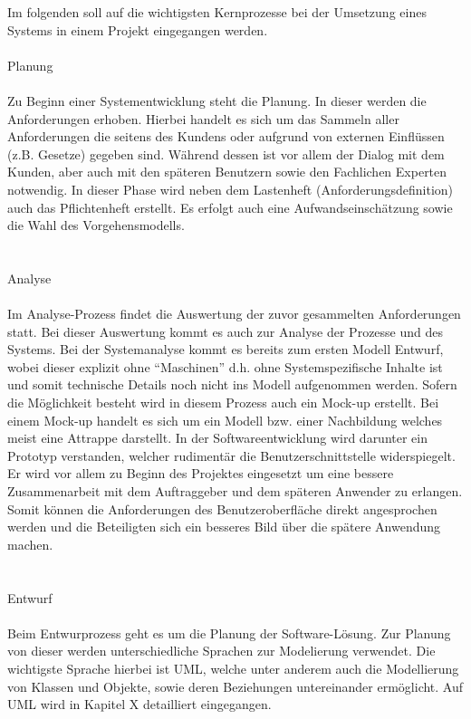 Im folgenden soll auf die wichtigsten Kernprozesse bei der Umsetzung eines Systems in einem Projekt eingegangen werden.\\
\\
Planung\\
\\
Zu Beginn einer Systementwicklung steht die Planung. In dieser werden die Anforderungen erhoben. Hierbei handelt es sich um das Sammeln aller Anforderungen die seitens des Kundens oder aufgrund von externen Einflüssen (z.B. Gesetze) gegeben sind. Während dessen ist vor allem der Dialog mit dem Kunden, aber auch mit den späteren Benutzern sowie den Fachlichen Experten notwendig. In dieser Phase wird neben dem Lastenheft (Anforderungsdefinition) auch das Pflichtenheft erstellt. Es erfolgt auch eine Aufwandseinschätzung sowie die Wahl des Vorgehensmodells.\\
\\
\\
Analyse\\
\\
Im Analyse-Prozess findet die Auswertung der zuvor gesammelten Anforderungen statt. Bei dieser Auswertung kommt es auch zur Analyse der Prozesse und des Systems. Bei der Systemanalyse kommt es bereits zum ersten Modell Entwurf, wobei dieser explizit ohne “Maschinen” d.h. ohne Systemspezifische Inhalte ist und somit technische Details noch nicht ins Modell aufgenommen werden. Sofern die Möglichkeit besteht wird in diesem Prozess auch ein Mock-up erstellt. Bei einem Mock-up handelt es sich um ein Modell bzw. einer Nachbildung welches meist eine Attrappe darstellt. In der Softwareentwicklung wird darunter ein Prototyp verstanden, welcher rudimentär die Benutzerschnittstelle widerspiegelt. Er wird vor allem zu Beginn des Projektes eingesetzt um eine bessere Zusammenarbeit mit dem Auftraggeber und dem späteren Anwender zu erlangen. Somit können die Anforderungen des Benutzeroberfläche direkt angesprochen werden und die Beteiligten sich ein besseres Bild über die spätere Anwendung machen.\\
\\
\\
Entwurf\\
\\
Beim Entwurprozess geht es um die Planung der Software-Lösung. Zur Planung von dieser werden unterschiedliche Sprachen zur Modelierung verwendet. Die wichtigste Sprache hierbei ist UML, welche unter anderem auch die Modellierung von Klassen und Objekte, sowie deren Beziehungen untereinander ermöglicht. Auf UML wird in Kapitel X detailliert eingegangen.
